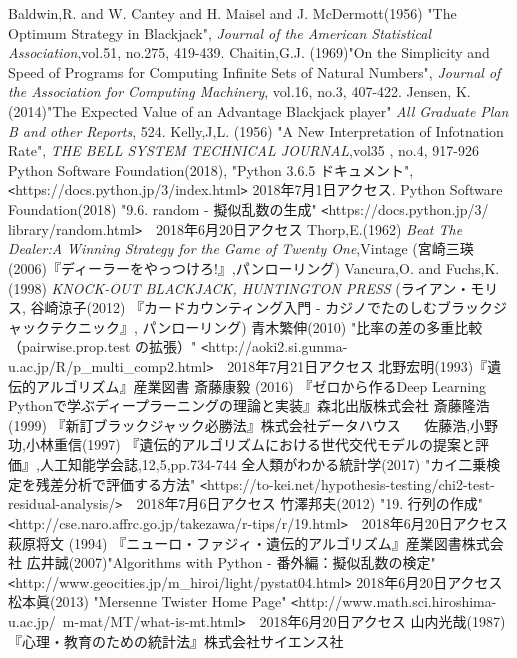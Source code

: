 \begin{thebibliography}{20}
   Baldwin,R. and W. Cantey and H. Maisel and J. McDermott(1956) "The Optimum Strategy in Blackjack", {\it{Journal of the American Statistical Association}},vol.51, no.275, 419-439.
   Chaitin,G.J. (1969)"On the Simplicity and Speed of Programs for Computing Infinite Sets of Natural Numbers", {\it{Journal of the Association for Computing Machinery}}, vol.16, no.3, 407-422.
   Jensen, K. (2014)"The Expected Value of an Advantage Blackjack player" {\it{All Graduate Plan B and other Reports}}, 524.
   Kelly,J,L. (1956) "A New Interpretation of Infotnation Rate", {\it{THE BELL SYSTEM TECHNICAL JOURNAL}},vol35 , no.4, 917-926
   Python Software Foundation(2018), "Python 3.6.5 ドキュメント", \verb|<|https://docs.python.jp/3/index.html\verb|>| 2018年7月1日アクセス.
   Python Software Foundation(2018) "9.6. random - 擬似乱数の生成" \verb|<|https://docs.python.jp/3/ library/random.html\verb|>|　2018年6月20日アクセス
   Thorp,E.(1962) {\it{Beat The Dealer:A Winning Strategy for the Game of Twenty One}},Vintage (宮崎三瑛(2006)『ディーラーをやっつけろ!』,パンローリング)
   Vancura,O. and Fuchs,K.(1998) {\it{KNOCK-OUT BLACKJACK, HUNTINGTON PRESS}} (ライアン・モリス, 谷崎涼子(2012) 『カードカウンティング入門 - カジノでたのしむブラックジャックテクニック』, パンローリング)
   青木繁伸(2010) "比率の差の多重比較（pairwise.prop.test の拡張）" \verb|<|http://aoki2.si.gunma-u.ac.jp/R/p\_multi\_comp2.html\verb|>|　2018年7月21日アクセス
   北野宏明(1993)『遺伝的アルゴリズム』産業図書
   斎藤康毅 (2016) 『ゼロから作るDeep Learning Pythonで学ぶディープラーニングの理論と実装』森北出版株式会社
   斎藤隆浩 (1999) 『新訂ブラックジャック必勝法』株式会社データハウス
　 佐藤浩,小野功,小林重信(1997) 『遺伝的アルゴリズムにおける世代交代モデルの提案と評価』,人工知能学会誌,12,5,pp.734-744
   全人類がわかる統計学(2017) "カイ二乗検定を残差分析で評価する方法" \verb|<|https://to-kei.net/hypothesis-testing/chi2-test-residual-analysis/\verb|>|　2018年7月6日アクセス
   竹澤邦夫(2012) "19. 行列の作成" \verb|<|http://cse.naro.affrc.go.jp/takezawa/r-tips/r/19.html\verb|>|　2018年6月20日アクセス
   萩原将文 (1994) 『ニューロ・ファジィ・遺伝的アルゴリズム』産業図書株式会社
  広井誠(2007)"Algorithms with Python - 番外編：擬似乱数の検定" \verb|<|http://www.geocities.jp/m\_hiroi/light/pystat04.html\verb|>| 2018年6月20日アクセス
   松本眞(2013) "Mersenne Twister Home Page" \verb|<|http://www.math.sci.hiroshima-u.ac.jp/~m-mat/MT/what-is-mt.html\verb|>|　2018年6月20日アクセス
   山内光哉(1987) 『心理・教育のための統計法』株式会社サイエンス社
\end{thebibliography}

